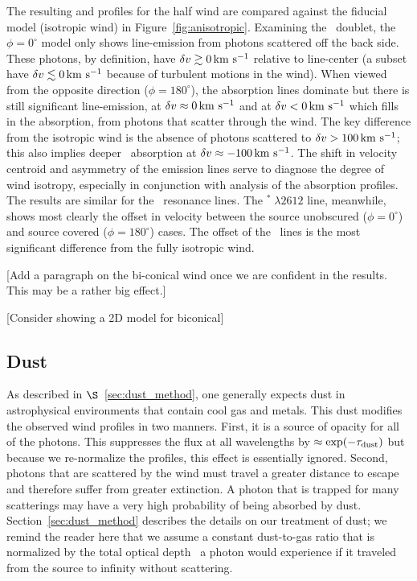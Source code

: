 \documentclass[12pt,preprint]{aastex}
\begin{document}
The resulting  and
 profiles for the half wind are compared against the fiducial model
(isotropic wind) in Figure~\ref{fig:anisotropic}.  
Examining the \mgiid\ doublet, 
the $\phi = 0^\circ$ model only shows
line-emission from photons scattered
off the back side.  These photons, by definition, have $\delta v \gtrsim 0 \, {\rm km~s^{-1}}$
relative to line-center (a subset have $\delta v \lesssim 0 \, {\rm km~s^{-1}}$ because
of turbulent motions in the wind). 
When viewed from the opposite direction ($\phi = 180^\circ$), the
absorption lines dominate but there is still significant
line-emission, at $\delta v \approx 0 \, {\rm km~s^{-1}}$ and at $\delta v < 0 \, {\rm km~s^{-1}}$ which fills
in the absorption, from photons that scatter through the wind.  The
key difference from the isotropic wind is the absence of photons
scattered to $\delta v > 100 \, {\rm km~s^{-1}}$;  this also implies deeper 
\mgiib\ absorption at $\delta v \approx -100 \, {\rm km~s^{-1}}$. The 
shift in velocity centroid and asymmetry of the emission lines
serve to diagnose the degree of wind isotropy, especially in
conjunction with analysis of the absorption profiles. 
The results are similar for the \feiid\ resonance lines.  The
$^* \; \lambda 2612$ line, meanwhile, shows most clearly the
offset in velocity between the source unobscured ($\phi = 0^\circ$)
and source covered ($\phi = 180^\circ$) cases.  The offset of the
\feiis\ lines is the most significant 
difference from the fully isotropic wind.

[Add a paragraph on the bi-conical wind once we are confident in the
results.  This may be a rather big effect.]

[Consider showing a 2D model for biconical]

\subsection{Dust}
\label{sec:dust}

As described in $\S$~\ref{sec:dust_method}, 
one generally expects dust in astrophysical environments that contain
cool gas and metals.  This dust 
modifies the observed wind profiles in two manners. 
First, it is a source of opacity for all of 
the photons.  This suppresses the flux at all
wavelengths by $\approx \exp(-\tau_{\rm dust})$ but because we re-normalize the
profiles, this effect is essentially ignored.  Second, photons that are
scattered by the wind must travel a greater
distance to escape and therefore suffer from greater extinction.  A photon that is
trapped for many scatterings may have a very high probability of being absorbed
by dust.  
Section~\ref{sec:dust_method} describes the details on our treatment of dust; we 
remind the reader here that we assume a constant dust-to-gas ratio 
that is normalized by the total optical
depth \taud\ a photon would experience if it traveled from the
source to infinity without scattering. 
\end{document}
